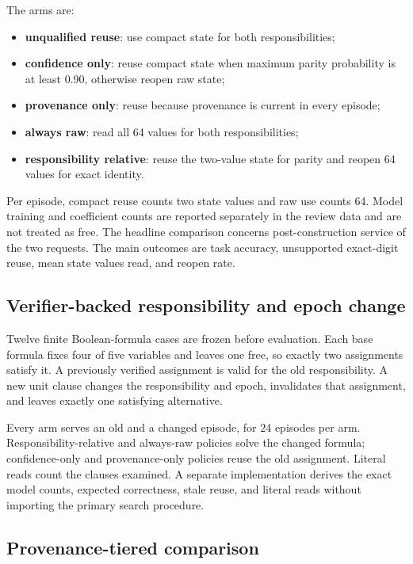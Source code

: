 \documentclass[10pt]{article}
\begin{document}
The arms are:
\begin{itemize}
\item \textbf{unqualified reuse}: use compact state for both responsibilities;
\item \textbf{confidence only}: reuse compact state when maximum parity probability is at least 0.90, otherwise reopen raw state;
\item \textbf{provenance only}: reuse because provenance is current in every episode;
\item \textbf{always raw}: read all 64 values for both responsibilities;
\item \textbf{responsibility relative}: reuse the two-value state for parity and reopen 64 values for exact identity.
\end{itemize}

Per episode, compact reuse counts two state values and raw use counts 64. Model training and coefficient counts are reported separately in the review data and are not treated as free. The headline comparison concerns post-construction service of the two requests. The main outcomes are task accuracy, unsupported exact-digit reuse, mean state values read, and reopen rate.

\subsection{Verifier-backed responsibility and epoch change}

Twelve finite Boolean-formula cases are frozen before evaluation. Each base formula fixes four of five variables and leaves one free, so exactly two assignments satisfy it. A previously verified assignment is valid for the old responsibility. A new unit clause changes the responsibility and epoch, invalidates that assignment, and leaves exactly one satisfying alternative.

Every arm serves an old and a changed episode, for 24 episodes per arm. Responsibility-relative and always-raw policies solve the changed formula; confidence-only and provenance-only policies reuse the old assignment. Literal reads count the clauses examined. A separate implementation derives the exact model counts, expected correctness, stale reuse, and literal reads without importing the primary search procedure.

\subsection{Provenance-tiered comparison}
\end{document}
